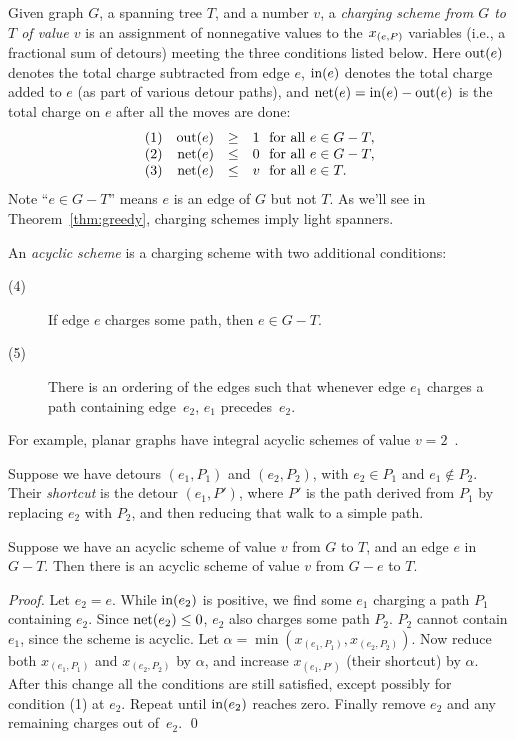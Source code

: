 \documentclass{llncs}
\begin{document}
Given graph $G$, a spanning tree $T$, and a number $v$, a
\emph{charging scheme from $G$ to $T$ of value $v$} is an assignment
of nonnegative values to the $x_{(e,P)}$ variables (i.e., a fractional
sum of detours) meeting the three conditions listed below.  Here 
$\mbox{out$(e)$}$ denotes the total charge subtracted from edge $e$,
$\mbox{in$(e)$}$ denotes the total charge added to $e$ (as part of various detour
paths),
and $\mbox{net$(e)$} = \mbox{in$(e)$} - \mbox{out$(e)$}$ is the total charge on $e$ after all
the moves are done:
\[
\begin{array}[t]{l@{~~~}rcl@{~~}l}
(1) & \Out{e} & \geq & 1
& \mbox{for all } e \in G-T, \\
(2) &     \Net{e} & \leq & 0 
& \mbox{for all } e \in G-T, \\
(3) &     \Net{e} & \leq & v
& \mbox{for all } e \in T.
\end{array}
\]
Note ``$e \in G-T$'' means $e$ is an edge of $G$ but not $T$.
As we'll see in Theorem~\ref{thm:greedy}, charging schemes imply light
spanners.
\begin{definition} 
An \emph{acyclic scheme} is a charging scheme with two additional
conditions:
\begin{description}
\item[\textnormal{(4)}] If edge $e$ charges some path, then $e\in
G-T$.
\item[\textnormal{(5)}] There is an ordering of the edges such that whenever
edge $e_1$ charges a path containing edge~$e_2$, $e_1$ precedes~$e_2$.
\end{description}
\end{definition}
For example, planar graphs have integral acyclic
schemes of value $v=2$~\cite{Althofer:1993:SSW:156252.156258}.
\begin{definition}
Suppose we have detours $(e_1,P_1)$ and $(e_2,P_2)$, with $e_2\in P_1$
and $e_1\not\in P_2$.  Their \emph{shortcut} is the detour $(e_1,P')$,
where $P'$ is the path derived from $P_1$ by replacing $e_2$ with
$P_2$, and then reducing that walk to a simple path.
\end{definition}

\begin{lemma}\label{lem:shortcut} 
Suppose we have an acyclic scheme of value $v$ from $G$ to $T$, and
an edge $e$ in $G-T$.  Then there is an acyclic scheme of value $v$
from $G-e$ to $T$.
\end{lemma}

\begin{proof}
Let $e_2=e$.  While $\mbox{in$(e_2)$}$ is positive, we find some $e_1$ charging
a path $P_1$ containing $e_2$.  Since $\mbox{net$(e_2)$}
\leq 0$, $e_2$ also charges some path $P_2$.  $P_2$
cannot contain $e_1$, since the scheme is acyclic.  Let
$\alpha=\min(x_{(e_1,P_1)}, x_{(e_2,P_2)})$.  Now reduce both
$x_{(e_1,P_1)}$ and $x_{(e_2,P_2)}$ by $\alpha$, and increase
$x_{(e_1,P')}$ (their shortcut) by $\alpha$.  After this change all the
conditions are still satisfied, except possibly for condition (1) at $e_2$.
Repeat until $\mbox{in$(e_2)$}$ reaches zero.  Finally remove $e_2$ and any
remaining charges out of~$e_2$.  \qed
\end{proof}
\end{document}
